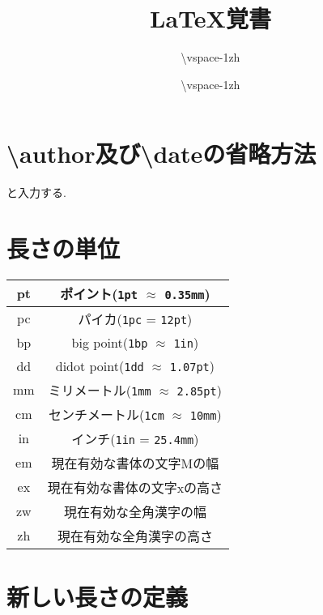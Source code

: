 \documentclass[12pt,uplatex]{jsarticle}
\title{\LaTeX 覚書}
\author{\vspace{-1zh}}\date{\vspace{-1zh}}
\begin{document}
  \maketitle
  \tableofcontents
  \clearpage

  \section{\textbackslash author及び\textbackslash dateの省略方法}

  \begin{excode}
      \author{\textbackslash vspace{-1zh}}
      \date{\textbackslash vspace{-1zh}}
  \end{excode}
  と入力する.

  \section{長さの単位}

  \begin{table}[H]
  	\centering

  	\begin{tabular}{|c|c|} \hline
  		pt & ポイント(\verb|1pt| $\approx$ \verb|0.35mm|) \\ \hline
  		pc & パイカ(\verb|1pc| = \verb|12pt|) \\ \hline
  		bp & big point(\verb|1bp| $\approx$ \verb|1in|) \\ \hline
  		dd & didot point(\verb|1dd| $\approx$ \verb|1.07pt|) \\ \hline
  		mm & ミリメートル(\verb|1mm| $\approx$ \verb|2.85pt|) \\ \hline
  		cm & センチメートル(\verb|1cm| $\approx$ \verb|10mm|) \\ \hline
  		in & インチ(\verb|1in| = \verb|25.4mm|) \\ \hline
  		em & 現在有効な書体の文字Mの幅 \\ \hline
  		ex & 現在有効な書体の文字xの高さ \\ \hline
  		zw & 現在有効な全角漢字の幅 \\ \hline
  		zh & 現在有効な全角漢字の高さ \\ \hline
  	\end{tabular}
  \end{table}

  \section{新しい長さの定義}
\end{document}
